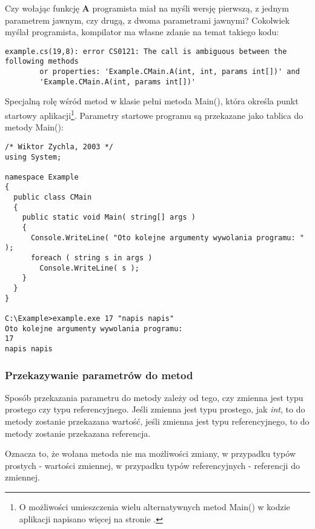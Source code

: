 Czy wołając funkcję {\bf A} programista miał na myśli wersję pierwszą, z jednym parametrem jawnym, czy drugą,
z dwoma parametrami jawnymi? Cokolwiek myślał programista, kompilator ma własne zdanie na temat takiego
kodu:

\begin{scriptsize}
\begin{verbatim}
example.cs(19,8): error CS0121: The call is ambiguous between the following methods
        or properties: 'Example.CMain.A(int, int, params int[])' and
        'Example.CMain.A(int, params int[])'
\end{verbatim}
\end{scriptsize}

Specjalną rolę wśród metod w klasie pełni metoda Main(), która określa punkt startowy 
aplikacji\footnote{O możliwości
umieszczenia wielu alternatywnych metod Main() w kodzie aplikacji napisano więcej na stronie 
\pageref{main_wielerazy}.}. Parametry startowe programu są przekazane jako tablica do metody Main():

\begin{scriptsize}
\begin{verbatim}
/* Wiktor Zychla, 2003 */
using System;

namespace Example
{
  public class CMain
  {
    public static void Main( string[] args )
    {
      Console.WriteLine( "Oto kolejne argumenty wywolania programu: " );
      foreach ( string s in args )
        Console.WriteLine( s );
    }
  }
}

C:\Example>example.exe 17 "napis napis"
Oto kolejne argumenty wywolania programu:
17
napis napis
\end{verbatim}
\end{scriptsize}

\subsubsection{Przekazywanie parametrów do metod}

Sposób przekazania parametru do metody zależy od tego, czy zmienna jest typu prostego czy typu
referencyjnego. Jeśli zmienna jest typu prostego, jak {\em int}, to do metody zostanie przekazana wartość,
jeśli zmienna jest typu referencyjnego, to do metody zostanie przekazana referencja.

Oznacza to, że wołana metoda nie ma możliwości zmiany, w przypadku typów prostych - wartości zmiennej,
w przypadku typów referencyjnych - referencji do zmiennej. 

